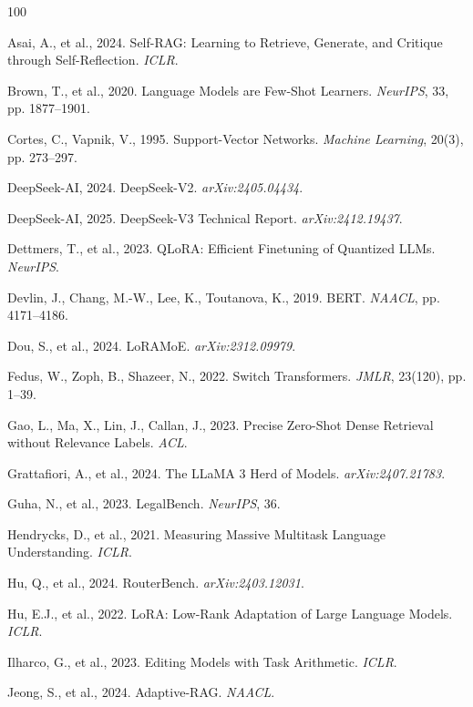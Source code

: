 \documentclass[a4paper,fleql]{cas-sc}
\begin{document}
\begin{thebibliography}{100}

Asai, A., et al., 2024. Self-RAG: Learning to Retrieve, Generate, and Critique through Self-Reflection. \textit{ICLR}.

Brown, T., et al., 2020. Language Models are Few-Shot Learners. \textit{NeurIPS}, 33, pp. 1877--1901.

Cortes, C., Vapnik, V., 1995. Support-Vector Networks. \textit{Machine Learning}, 20(3), pp. 273--297.

DeepSeek-AI, 2024. DeepSeek-V2. \textit{arXiv:2405.04434}.

DeepSeek-AI, 2025. DeepSeek-V3 Technical Report. \textit{arXiv:2412.19437}.

Dettmers, T., et al., 2023. QLoRA: Efficient Finetuning of Quantized LLMs. \textit{NeurIPS}.

Devlin, J., Chang, M.-W., Lee, K., Toutanova, K., 2019. BERT. \textit{NAACL}, pp. 4171--4186.

Dou, S., et al., 2024. LoRAMoE. \textit{arXiv:2312.09979}.

Fedus, W., Zoph, B., Shazeer, N., 2022. Switch Transformers. \textit{JMLR}, 23(120), pp. 1--39.

Gao, L., Ma, X., Lin, J., Callan, J., 2023. Precise Zero-Shot Dense Retrieval without Relevance Labels. \textit{ACL}.

Grattafiori, A., et al., 2024. The LLaMA 3 Herd of Models. \textit{arXiv:2407.21783}.

Guha, N., et al., 2023. LegalBench. \textit{NeurIPS}, 36.

Hendrycks, D., et al., 2021. Measuring Massive Multitask Language Understanding. \textit{ICLR}.

Hu, Q., et al., 2024. RouterBench. \textit{arXiv:2403.12031}.

Hu, E.J., et al., 2022. LoRA: Low-Rank Adaptation of Large Language Models. \textit{ICLR}.

Ilharco, G., et al., 2023. Editing Models with Task Arithmetic. \textit{ICLR}.

Jeong, S., et al., 2024. Adaptive-RAG. \textit{NAACL}.


\end{thebibliography}
\end{document}
